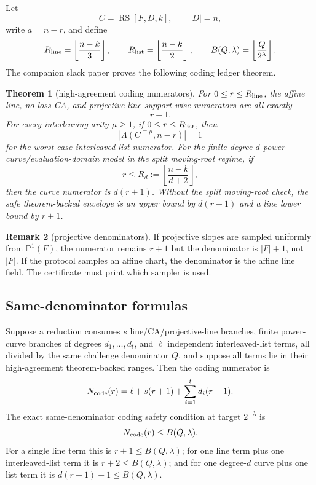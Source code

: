 \documentclass[11pt]{article}
\newtheorem{theorem}{Theorem}[section]
\theoremstyle{definition}
\newtheorem{remark}[theorem]{Remark}
\newcommand{\RS}{\operatorname{RS}}
\newcommand{\Int}[2]{#1^{\equiv #2}}
\begin{document}
Let
\[
        C=\RS[F,D,k],\qquad |D|=n,
\]
write \(a=n-r\), and define
\[
        R_{\rm line}=\left\lfloor\frac{n-k}{3}\right\rfloor,
        \qquad
        R_{\rm list}=\left\lfloor\frac{n-k}{2}\right\rfloor,
        \qquad
        B(Q,\lambda)=\left\lfloor\frac{Q}{2^\lambda}\right\rfloor .
\]
The companion slack paper proves the following coding ledger theorem.

\begin{theorem}[high-agreement coding numerators]\label{thm:C-high-agreement-coding-numerators}
For \(0\le r\le R_{\rm line}\), the affine line, no-loss CA, and projective-line
support-wise numerators are all exactly
\[
        r+1 .
\]
For every interleaving arity \(\mu\ge1\), if \(0\le r\le R_{\rm list}\), then
\[
        |\Lambda(\Int{C}{\mu},n-r)|=1
\]
for the worst-case interleaved list numerator.  For the finite degree-\(d\)
power-curve/evaluation-domain model in the split moving-root regime, if
\[
        r\le R_d:=\left\lfloor\frac{n-k}{d+2}\right\rfloor,
\]
then the curve numerator is \(d(r+1)\).  Without the split moving-root check, the
safe theorem-backed envelope is an upper bound by \(d(r+1)\) and a line lower
bound by \(r+1\).
\end{theorem}

\begin{remark}[projective denominators]
If projective slopes are sampled uniformly from \(\mathbb P^1(F)\), the
numerator remains \(r+1\) but the denominator is \(|F|+1\), not \(|F|\).  If the
protocol samples an affine chart, the denominator is the affine line field.  The
certificate must print which sampler is used.
\end{remark}

\subsection{Same-denominator formulas}

Suppose a reduction consumes \(s\) line/CA/projective-line branches, finite
power-curve branches of degrees \(d_1,\ldots,d_t\), and \(\ell\) independent
interleaved-list terms, all divided by the same challenge denominator \(Q\), and
suppose all terms lie in their high-agreement theorem-backed ranges.  Then the
coding numerator is
\[
        N_{\rm code}(r)=\ell+s(r+1)+\sum_{i=1}^t d_i(r+1).
\]
The exact same-denominator coding safety condition at target \(2^{-\lambda}\) is
\[
        N_{\rm code}(r)\le B(Q,\lambda).
\]
For a single line term this is \(r+1\le B(Q,\lambda)\); for one line term plus
one interleaved-list term it is \(r+2\le B(Q,\lambda)\); and for one degree-\(d\)
curve plus one list term it is \(d(r+1)+1\le B(Q,\lambda)\).
\end{document}
